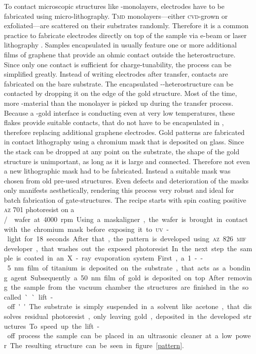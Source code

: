 To contact microscopic structures like \tmd-monolayers, electrodes have to be fabricated using micro-lithography. \textsc{Tmd} monolayers---either \textsc{cvd}-grown or exfoliated---are scattered on their substrates randomly. Therefore it is a common practice to fabricate electrodes directly on top of the sample via e-beam or laser lithography  \cite{wang_electronic_2015, fallahazad_shubnikovhaas_2016}. Samples encapsulated in \hbng usually feature one or more additional films of graphene that provide an ohmic contact outside the heterostructure. Since only one contact is sufficient for charge-tunability, the process can be simplified greatly. Instead of writing electrodes after transfer, contacts are fabricated on the bare substrate. The encapsulated \hbn-\tmd-heterostructure can be contacted by dropping it on the edge of the gold structure. Most of the time, more \tmd-material than the monolayer is picked up during the transfer process. Because a \tmd-gold interface is conducting even at very low temperatures, these flakes provide suitable contacts, that do not have to be encapsulated in \hbn, therefore replacing additional graphene electrodes. Gold patterns are fabricated in contact lithography using a chromium mask that is deposited on glass. Since the stack can be dropped at any point on the substrate, the shape of the gold structure is unimportant, as long as it is large and connected. Therefore not even a new lithographic mask had to be fabricated. Instead a suitable mask was chosen from old pre-used structures. Even defects and deterioration of the masks only manifests aesthetically, rendering this process very robust and ideal for batch fabrication of gate-structures. The recipe starts with spin coating positive \textsc{az} 701 photoresist on a \si/\sio wafer at 4000 rpm. Using a maskaligner, the wafer is brought in contact with the chromium mask before exposing it to \textsc{uv}-light for 18 seconds. After that, the pattern is developed using \textsc{az} 826 \textsc{mif} developer, that washes out the exposed photoresist.

In the next step the sample is coated in an X-ray evaporation system. First, a 1--5 nm film of titanium is deposited on the substrate, that acts as a bonding agent. Subsequently a 50 nm film of gold is deposited on top. After removing the sample from the vacuum chamber the structures are finished in the so called ``lift-off''. The substrate is simply suspended in a solvent like acetone, that dissolves residual photoresist, only leaving gold, deposited in the developed structures. To speed up the lift-off process the sample can be placed in an ultrasonic cleaner at a low power. The resulting structure can be seen in figure \ref{pattern}. 


